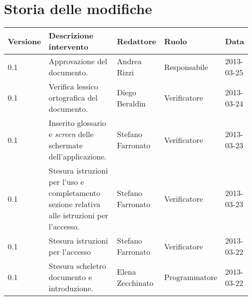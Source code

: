 \newcommand{\docName}{ManualeUtente}
\newcommand{\docFileName}{manuale\_utente.1.0.pdf}
\newcommand{\docVers}{1.0}
\newcommand{\creationDate}{2013-03-07}
\newcommand{\modificationDate}{2013-03-07}
\newcommand{\docState}{Non approvato}
\newcommand{\docUsage}{Esterno}
\newcommand{\docDistributionList}{Prof. Tullio Vardanega\\ & Prof. Riccardo Cardin}
\newcommand{\docAuthors}{Elena Zecchinato}
\newcommand{\approvedBy}{Andrea Rizzi}
\newcommand{\verifiedBy}{---}
\newcommand{\docRoot}{..}
\def\INDICETABELLE{true}
\def\INDICEFIGURE{true}



\usepackage[italian]{varioref}





\section*{Storia delle modifiche}
\begin{longtable}{lp{}lll}
\toprule
Versione & Descrizione intervento & Redattore & Ruolo & Data\\
\midrule %

0.1 & Approvazione del documento. & Andrea Rizzi & Responsabile & 2013-03-25\\
0.1 & Verifica lessico ortografica del documento. & Diego Beraldin & Verificatore & 2013-03-24\\
0.1 & Inserito glossario e \textit{screen} delle schermate dell'applicazione.& Stefano Farronato & Verificatore & 2013-03-23\\
0.1 & Stesura istruzioni per l'uso e completamento sezione relativa alle istruzioni per l'accesso. & Stefano Farronato & Verificatore & 2013-03-23\\
0.1 & Stesura istruzioni per l'accesso & Stefano Farronato & Verificatore & 2013-03-22\\
0.1 & Stesura scheletro documento e introduzione. & Elena Zecchinato & Programmatore & 2013-03-22\\
\bottomrule
\end{longtable}
\newpage

